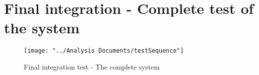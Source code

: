 \section{Final integration - Complete test of the system}
\begin{figure}[H]
	\centering
	\texttt{[image: "../Analysis Documents/testSequence"]}
	\caption{Final integration test - The complete system}
	\label{fig:components}
\end{figure}
